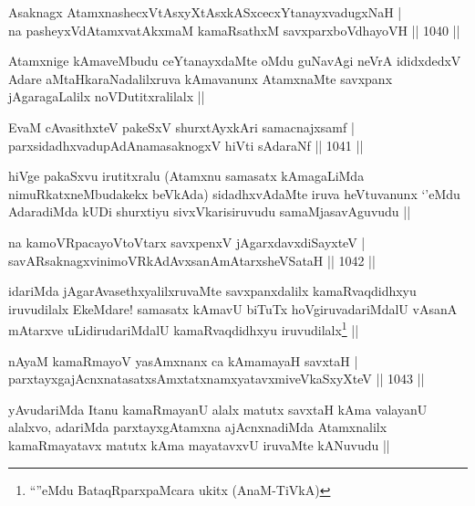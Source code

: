 \begin{shl}
Asaknagx AtamxnashecxVtAsxyXtAsxkASxcecxYtanayxvadugxNaH | \\
na pasheyxVdAtamxvatAkxmaM kamaRsathxM savxparxboVdhayoVH \hfill||  1040 ||  
\end{shl}

\begin{artha}
Atamxnige kAmaveMbudu ceYtanayxdaMte oMdu guNavAgi neVrA ididxdedxV Adare aMtaHkaraNadalilxruva kAmavanunx AtamxnaMte savxpanx jAgaragaLalilx noVDutitxralilalx ||
\end{artha}

\begin{shl}
EvaM cAvasithxteV pakeSxV shurxtAyx\s kAri samacnajxsamf | \\
parxsidadhxvadupAdAnamasaknogxV hiVti sAdaraNf \hfill||  1041 ||  
\end{shl}

\begin{artha}
hiVge pakaSxvu irutitxralu (Atamxnu samasatx kAmagaLiMda nimuRkatxneMbudakekx beVkAda) sidadhxvAdaMte iruva heVtuvanunx `\stext'eMdu AdaradiMda kUDi shurxtiyu sivxVkarisiruvudu samaMjasavAguvudu ||
\end{artha}

\begin{shl}
na kamoVRpacayoV\s toV\s tarx savxpenxV jAgarxdavxdiSayxteV | \\
savARsaknagxvinimoVRkAdAvxsanAmAtarxsheVSataH \hfill||  1042 ||  
\end{shl}

\begin{artha}
idariMda jAgarAvasethxyalilxruvaMte savxpanxdalilx kamaRvaqdidhxyu iruvudilalx EkeMdare! samasatx kAmavU biTuTx hoVgiruvadariMdalU vAsanA mAtarxve uLidirudariMdalU kamaRvaqdidhxyu iruvudilalx\footnote{``\stext''eMdu BataqRparxpaMcara ukitx (AnaM-TiVkA)} ||
\end{artha}


\begin{shl}
nAyaM kamaRmayoV yasAmxnanx ca kAmamayaH savxtaH | \\
parxtayxgajAcnxnatasatxsAmxtatxnamxyatavxmiveVkaSxyXteV \hfill||  1043 ||  
\end{shl}

\begin{artha}
yAvudariMda Itanu kamaRmayanU alalx matutx savxtaH kAma valayanU alalxvo, adariMda parxtayxgAtamxna ajAcnxnadiMda Atamxnalilx kamaRmayatavx matutx kAma mayatavxvU iruvaMte kANuvudu ||
\end{artha}

